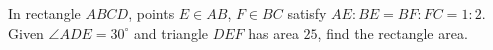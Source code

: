 In rectangle $ABCD$, points $E\in AB$, $F\in BC$ satisfy $AE:BE=BF:FC=1:2$. Given $\angle ADE=30^\circ$ and triangle $DEF$ has area $25$, find the rectangle area.
